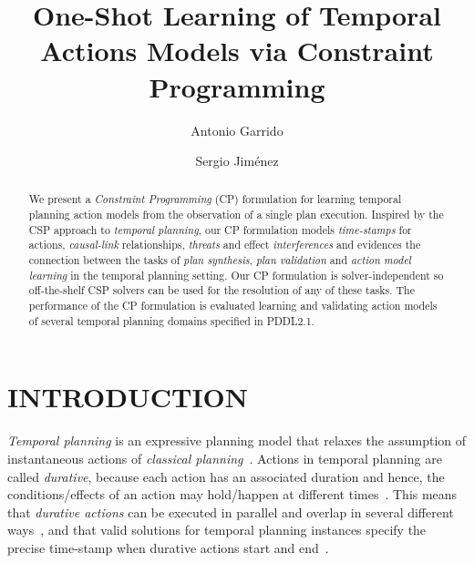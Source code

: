 \documentclass{ecai}
\begin{document}
\title{One-Shot Learning of Temporal Actions Models via Constraint Programming}
\author{Antonio Garrido \and Sergio Jim\'enez}
 
 
\maketitle

\begin{abstract}
  We present a {\em Constraint Programming} (CP) formulation for learning temporal planning  action models from the observation of a single plan execution. Inspired by the CSP approach to {\em temporal planning}, our CP formulation models {\em time-stamps} for actions, {\em causal-link} relationships, {\em threats} and effect {\em interferences} and evidences the connection between the tasks of {\em plan synthesis}, {\em plan validation} and {\em action model learning} in the temporal planning setting. Our CP formulation is solver-independent so off-the-shelf CSP solvers can be used for the resolution of any of these tasks. The performance of the CP formulation is evaluated learning and validating action models of several temporal planning domains specified in PDDL2.1. %
\end{abstract}



\section{INTRODUCTION}

{\em Temporal planning} is an expressive planning model that relaxes the assumption of instantaneous actions of {\em classical planning}~\cite{geffner2013concise}. Actions in temporal planning are called {\em durative}, because each action has an associated duration and hence, the conditions/effects of an action may hold/happen at different times~\cite{fox2003pddl2}. This means that {\em durative actions} can be executed in parallel and overlap in several different ways~\cite{cushing2007temporal}, and that valid solutions for temporal planning instances specify the precise time-stamp when durative actions start and end~\cite{howey2004val}.
\end{document}
